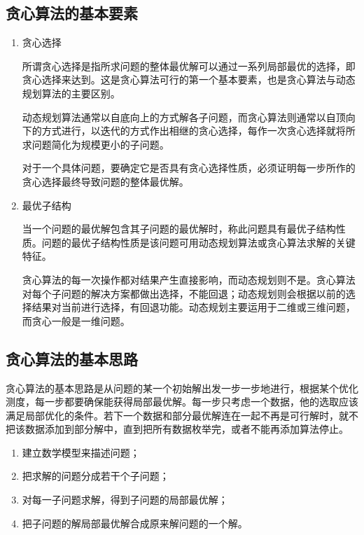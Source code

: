 \subsection{贪心算法的基本要素}

\begin{enumerate}
    \item 贪心选择
    
    所谓贪心选择是指所求问题的整体最优解可以通过一系列局部最优的选择，即贪心选择来达到。这是贪心算法可行的第一个基本要素，也是贪心算法与动态规划算法的主要区别。

    动态规划算法通常以自底向上的方式解各子问题，而贪心算法则通常以自顶向下的方式进行，以迭代的方式作出相继的贪心选择，每作一次贪心选择就将所求问题简化为规模更小的子问题。

    对于一个具体问题，要确定它是否具有贪心选择性质，必须证明每一步所作的贪心选择最终导致问题的整体最优解。
    \item 最优子结构
    
    当一个问题的最优解包含其子问题的最优解时，称此问题具有最优子结构性质。问题的最优子结构性质是该问题可用动态规划算法或贪心算法求解的关键特征。
    
    贪心算法的每一次操作都对结果产生直接影响，而动态规划则不是。贪心算法对每个子问题的解决方案都做出选择，不能回退；动态规划则会根据以前的选择结果对当前进行选择，有回退功能。动态规划主要运用于二维或三维问题，而贪心一般是一维问题。
\end{enumerate}

\subsection{贪心算法的基本思路}

贪心算法的基本思路是从问题的某一个初始解出发一步一步地进行，根据某个优化测度，每一步都要确保能获得局部最优解。每一步只考虑一个数据，他的选取应该满足局部优化的条件。若下一个数据和部分最优解连在一起不再是可行解时，就不把该数据添加到部分解中，直到把所有数据枚举完，或者不能再添加算法停止。

\begin{enumerate}
    \item 建立数学模型来描述问题；
    \item 把求解的问题分成若干个子问题；
    \item 对每一子问题求解，得到子问题的局部最优解；
    \item 把子问题的解局部最优解合成原来解问题的一个解。
\end{enumerate}

